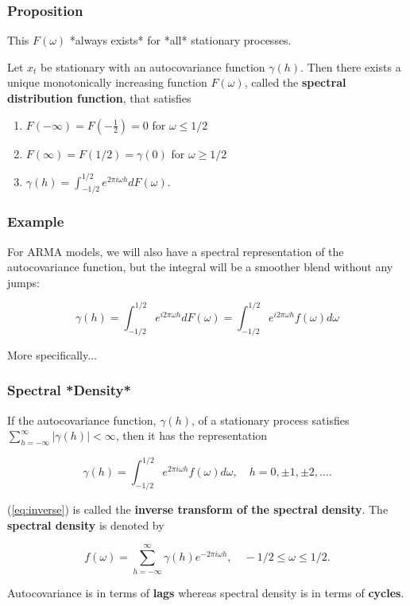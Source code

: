 \documentclass[%
xcolor=pdftex]{beamer}
\begin{document}
\begin{frame}
\frametitle{Proposition}

This $F(\omega)$ *always exists* for *all* stationary processes. 
\newline

Let $x_t$ be stationary with an autocovariance function $\gamma(h)$. Then there exists a unique monotonically increasing function $F(\omega)$, called the {\bf spectral distribution function}, that satisfies
\begin{enumerate}
\item $F(-\infty) = F(-\frac{1}{2}) = 0$ for $\omega \le 1/2$
\item $F(\infty) = F(1/2) = \gamma(0)$ for $\omega \ge 1/2$  
\item $\gamma(h) = \int_{-1/2}^{1/2} e^{2\pi i \omega h} dF(\omega)$.
\end{enumerate}

\end{frame}



\begin{frame}
\frametitle{Example}

For ARMA models, we will also have a spectral representation of the autocovariance function, but the integral will be a smoother blend without any jumps:

$$
\gamma(h) = \int_{-1/2}^{1/2} e^{ i 2 \pi \omega h} d F(\omega) = \int_{-1/2}^{1/2} e^{ i 2 \pi \omega h} f(\omega) d \omega
$$

More specifically...
\end{frame}



\begin{frame}
\frametitle{Spectral *Density*}


If the autocovariance function, $\gamma(h)$, of a stationary process satisfies $\sum_{h=-\infty}^{\infty}  |\gamma(h)| < \infty$, then it has the representation

\begin{equation} \label{eq:inverse}
\gamma(h) = \int^{1/2}_{-1/2}  e^{2\pi i\omega h} f(\omega) d\omega, \quad h=0,\pm 1,\pm 2,\ldots.
\end{equation}

(\ref{eq:inverse}) is called the \textbf{inverse transform of the spectral density}. The \textbf{spectral density} is denoted by

\begin{equation} \label{eq:spec}
f(\omega)  = \sum^\infty_{h=-\infty} \gamma(h) e^{-2\pi i\omega h}, \quad -1/2 \leq \omega \leq 1/2.
\end{equation}

Autocovariance is in terms of \textbf{lags} whereas spectral density is in terms of \textbf{cycles}.


\end{frame}
\end{document}
